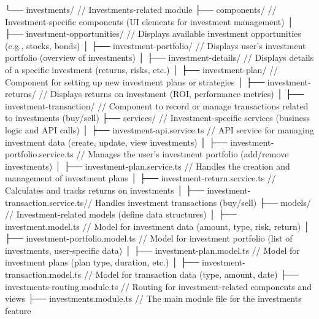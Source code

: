         └── investments/                            // Investments-related module
            ├── components/                         // Investment-specific components (UI elements for investment management)
            │   ├── investment-opportunities/       // Displays available investment opportunities (e.g., stocks, bonds)
            │   ├── investment-portfolio/           // Displays user's investment portfolio (overview of investments)
            │   ├── investment-details/             // Displays details of a specific investment (returns, risks, etc.)
            │   ├── investment-plan/                // Component for setting up new investment plans or strategies
            │   ├── investment-returns/             // Displays returns on investment (ROI, performance metrics)
            │   ├── investment-transaction/         // Component to record or manage transactions related to investments (buy/sell)
            ├── services/                           // Investment-specific services (business logic and API calls)
            │   ├── investment-api.service.ts       // API service for managing investment data (create, update, view investments)
            │   ├── investment-portfolio.service.ts // Manages the user’s investment portfolio (add/remove investments)
            │   ├── investment-plan.service.ts      // Handles the creation and management of investment plans
            │   ├── investment-return.service.ts    // Calculates and tracks returns on investments
            │   ├── investment-transaction.service.ts// Handles investment transactions (buy/sell)
            ├── models/                             // Investment-related models (define data structures)
            │   ├── investment.model.ts             // Model for investment data (amount, type, risk, return)
            │   ├── investment-portfolio.model.ts   // Model for investment portfolio (list of investments, user-specific data)
            │   ├── investment-plan.model.ts        // Model for investment plans (plan type, duration, etc.)
            │   ├── investment-transaction.model.ts // Model for transaction data (type, amount, date)
            ├── investments-routing.module.ts       // Routing for investment-related components and views
            ├── investments.module.ts               // The main module file for the investments feature

